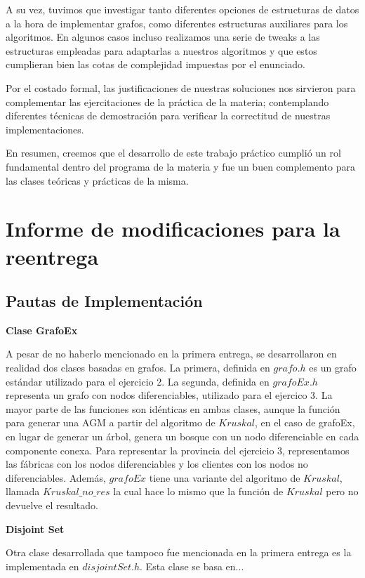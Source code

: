 \documentclass[10pt,a4paper]{article}
\begin{document}
A su vez, tuvimos que investigar tanto diferentes opciones de estructuras de datos a la hora de implementar grafos, como diferentes estructuras auxiliares para los algoritmos. En algunos casos incluso realizamos una serie de tweaks a las estructuras empleadas para adaptarlas a nuestros algoritmos y que estos cumplieran bien las cotas de complejidad impuestas por el enunciado.

Por el costado formal, las justificaciones de nuestras soluciones nos sirvieron para complementar las ejercitaciones de la práctica de la materia; contemplando diferentes técnicas de demostración para verificar la correctitud de nuestras implementaciones.

En resumen, creemos que el desarrollo de este trabajo práctico cumplió un rol fundamental dentro del programa de la materia y fue un buen complemento para las clases teóricas y prácticas de la misma.

\newpage
\section{Informe de modificaciones para la reentrega}

\subsection{Pautas de Implementación}
\textbf{Clase GrafoEx}
\par{A pesar de no haberlo mencionado en la primera entrega, se desarrollaron
en realidad dos clases basadas en grafos. La primera, definida en $grafo.h$
es un grafo estándar utilizado para el ejercicio 2. La segunda, definida en
$grafoEx.h$ representa un grafo con nodos diferenciables, utilizado para el
ejercico 3. La mayor parte de las funciones son idénticas en ambas clases,
aunque la función para generar una AGM a partir del algoritmo de $Kruskal$,
en el caso de grafoEx, en lugar de generar un árbol, genera un bosque con
un nodo diferenciable en cada componente conexa. Para representar la provincia
del ejercicio 3, representamos las fábricas con los nodos diferenciables y
los clientes con los nodos no diferenciables. Además, $grafoEx$ tiene una
variante del algoritmo de $Kruskal$, llamada $Kruskal\_no\_res$ la cual
hace lo mismo que la función de $Kruskal$ pero no devuelve el resultado.}

\textbf{Disjoint Set}
\par{Otra clase desarrollada que tampoco fue mencionada en la primera entrega
es la implementada en $disjointSet.h$. Esta clase se basa en...}
\end{document}
